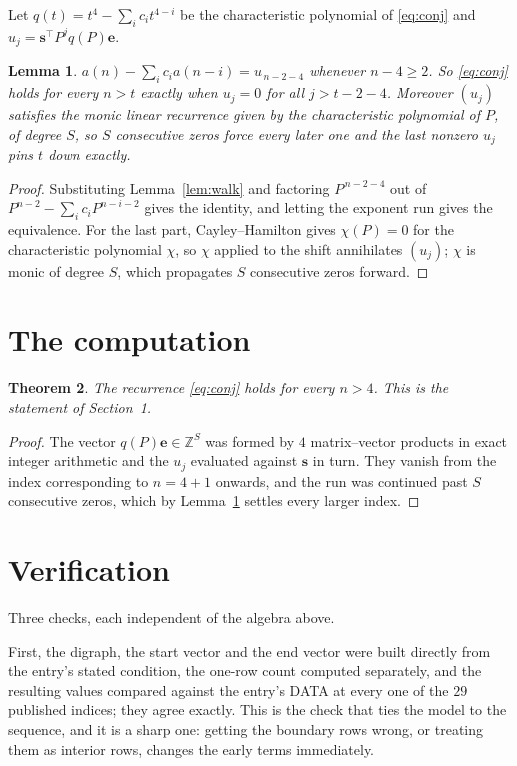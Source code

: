 \documentclass[11pt,a4paper]{article}
\theoremstyle{plain}
\newtheorem{theorem}{Theorem}
\newtheorem{lemma}[theorem]{Lemma}
\theoremstyle{definition}
\begin{document}
Let $q(t)=t^{4}-\sum_i c_i t^{4-i}$ be the characteristic polynomial of
\eqref{eq:conj} and $u_j=\mathbf{s}^{\!\top}P^{j}q(P)\mathbf{e}$.

\begin{lemma}\label{lem:crit}
$a(n)-\sum_i c_i a(n-i)=u_{\,n-2-4}$ whenever $n-4\ge2$. So \eqref{eq:conj}
holds for every $n>t$ exactly when $u_j=0$ for all $j>t-2-4$. Moreover $(u_j)$
satisfies the monic linear recurrence given by the characteristic polynomial of $P$, of
degree $S$, so $S$ consecutive zeros force every later one and the last nonzero $u_j$ pins
$t$ down exactly.
\end{lemma}

\begin{proof}
Substituting Lemma~\ref{lem:walk} and factoring $P^{\,n-2-4}$ out of
$P^{n-2}-\sum_i c_i P^{n-i-2}$ gives the identity, and letting the exponent run gives the
equivalence. For the last part, Cayley--Hamilton gives $\chi(P)=0$ for the characteristic
polynomial $\chi$, so $\chi$ applied to the shift annihilates $(u_j)$; $\chi$ is monic of
degree $S$, which propagates $S$ consecutive zeros forward.
\end{proof}

\section{The computation}

\begin{theorem}
The recurrence \eqref{eq:conj} holds for every $n>4$. This is the statement of
Section~1.
\end{theorem}

\begin{proof}
The vector $q(P)\mathbf{e}\in\mathbb{Z}^{S}$ was formed by $4$ matrix--vector
products in exact integer arithmetic and the $u_j$ evaluated against $\mathbf{s}$ in turn.
They vanish from the index corresponding to $n=4+1$ onwards, and the run was continued
past $S$ consecutive zeros, which by Lemma~\ref{lem:crit} settles every larger index.
\end{proof}

\section{Verification}

Three checks, each independent of the algebra above.

First, the digraph, the start vector and the end vector were built directly from the
entry's stated condition, the one-row count computed separately, and the resulting values
compared against the entry's DATA at every one of the $29$ published indices; they
agree exactly. This is the check that ties the model to the sequence, and it is a sharp one:
getting the boundary rows wrong, or treating them as interior rows, changes the early terms
immediately.
\end{document}

